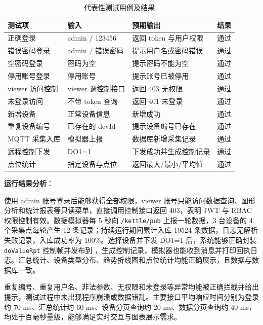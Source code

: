 \documentclass[12pt,hyperref,a4paper,UTF8]{ctexart}
\begin{document}
\begin{table}[!htbp]
    \centering
    \caption{代表性测试用例及结果}
    \label{tab:test}
    \begin{tabularx}{0.90\textwidth}{@{}L{3.2cm} L{3.5cm} Y C{1.6cm}@{}}
    \toprule
    \textbf{测试项} & \textbf{输入} & \textbf{预期输出} & \textbf{结果} \\
    \midrule
    正确登录 & admin / 123456 & 返回 token 与用户权限 & 通过 \\
    错误密码登录 & admin / 错误密码 & 提示用户名或密码错误 & 通过 \\
    空密码登录 & 密码为空 & 提示密码不能为空 & 通过 \\
    停用账号登录 & 停用账号 & 提示账号已被停用 & 通过 \\
    viewer 访问控制 & viewer 调控制接口 & 返回 403 无权限 & 通过 \\
    未登录访问 & 不带 token 查询 & 返回 401 未登录 & 通过 \\
    新增设备 & 正常设备信息 & 新增成功 & 通过 \\
    重复设备编号 & 已存在的 devId & 提示设备编号已存在 & 通过 \\
    MQTT 采集入库 & 模拟器上报 & 数据库新增采集记录 & 通过 \\
    远程控制下发 & DO1=1 & 下发成功并生成控制记录 & 通过 \\
    点位统计 & 指定设备与点位 & 返回最大/最小/平均值 & 通过 \\
    \bottomrule
    \end{tabularx}
\end{table}

\FloatBarrier

\textbf{运行结果分析}：

使用 admin 账号登录后能够获得全部权限，viewer 账号只能访问数据查询、图形分析和统计报表等只读菜单，直接调用控制接口返回 403，表明 JWT 与 RBAC 权限控制有效。数据模拟器每 5 秒向 \texttt{/kettle/pub} 上报一轮数据，3 台设备的 4 个采集点每轮产生 12 条记录；持续运行期间累计入库 19524 条数据，日志无解析失败记录，入库成功率为 100\%。选择设备并下发 DO1=1 后，系统能够正确封装 \texttt{doValueRpt} 控制帧并发布到 ，生成控制记录，模拟器也能收到消息并打印回执日志。汇总统计、设备类型分布、趋势折线图和点位统计均能正确展示，且数据与数据库一致。

重复编号、重复用户名、非法参数、无权限和未登录等异常均能被正确拦截并给出提示，测试过程中未出现程序崩溃或数据错乱。主要接口平均响应时间分别为登录约 70 ms、汇总统计约 60 ms、设备分页查询约 20 ms、数据分页查询约 40 ms，均处于百毫秒量级，能够满足实时交互与图表展示需求。
\end{document}
